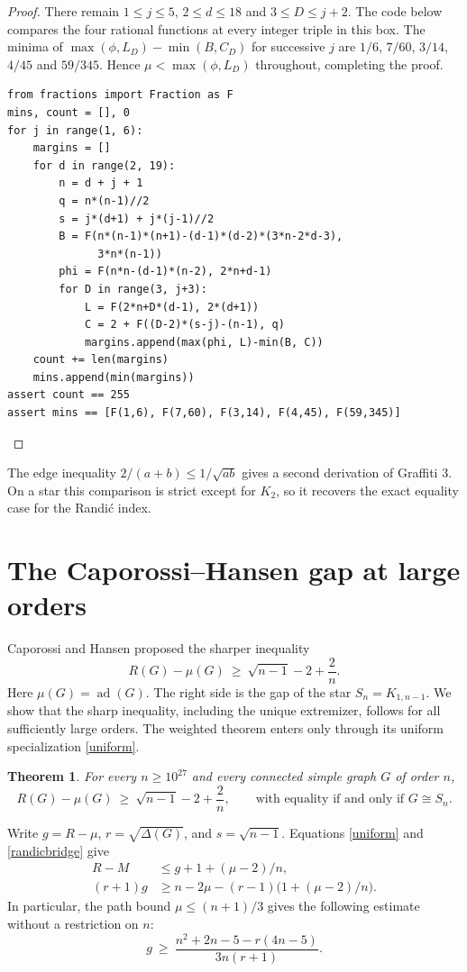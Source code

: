 \documentclass[11pt,a4paper]{article}
\newtheorem{theorem}{Theorem}[section]
\theoremstyle{remark}\newtheorem*{remark}{Remark}
\begin{document}
\begin{proof}
There remain $1\le j\le5$, $2\le d\le18$ and $3\le D\le j+2$. The code below compares the four rational functions at every integer triple in this box. The minima of $\max(\phi,L_D)-\min(B,C_D)$ for successive $j$ are $1/6$, $7/60$, $3/14$, $4/45$ and $59/345$. Hence $\mu<\max(\phi,L_D)$ throughout, completing the proof.
\begin{lstlisting}[basicstyle=\ttfamily\footnotesize,breaklines=true]
from fractions import Fraction as F
mins, count = [], 0
for j in range(1, 6):
    margins = []
    for d in range(2, 19):
        n = d + j + 1
        q = n*(n-1)//2
        s = j*(d+1) + j*(j-1)//2
        B = F(n*(n-1)*(n+1)-(d-1)*(d-2)*(3*n-2*d-3),
              3*n*(n-1))
        phi = F(n*n-(d-1)*(n-2), 2*n+d-1)
        for D in range(3, j+3):
            L = F(2*n+D*(d-1), 2*(d+1))
            C = 2 + F((D-2)*(s-j)-(n-1), q)
            margins.append(max(phi, L)-min(B, C))
    count += len(margins)
    mins.append(min(margins))
assert count == 255
assert mins == [F(1,6), F(7,60), F(3,14), F(4,45), F(59,345)]
\end{lstlisting}
\end{proof}

The edge inequality $2/(a+b)\le1/\sqrt{ab}$ gives a second derivation of Graffiti 3. On a star this comparison is strict except for $K_2$, so it recovers the exact equality case for the Randi\'c index.


\section{The Caporossi--Hansen gap at large orders}\label{sec:capgap}

Caporossi and Hansen \cite{cap} proposed the sharper inequality
\[
 R(G)-\mu(G)\ \ge\ \sqrt{n-1}-2+\frac2n .
\]
Here $\mu(G)=\operatorname{ad}(G)$.  The right side is the gap of the star
$S_n=K_{1,n-1}$.  We show that the sharp inequality, including the unique
extremizer, follows for all sufficiently large orders.  The weighted theorem
enters only through its uniform specialization \eqref{uniform}.

\begin{theorem}\label{thm:eventualCH}
For every $n\ge 10^{27}$ and every connected simple
graph $G$ of order $n$,
\[
 R(G)-\mu(G)\ \ge\ \sqrt{n-1}-2+\frac2n,
 \qquad\text{with equality if and only if }G\cong S_n .
\]
\end{theorem}

Write $g=R-\mu$, $r=\sqrt{\Delta(G)}$, and $s=\sqrt{n-1}$.
Equations \eqref{uniform} and \eqref{randicbridge} give
\begin{align}
 R-M &\le g+1+(\mu-2)/n, \label{gapdiff}\\
 (r+1)g &\ge n-2\mu-(r-1)\bigl(1+(\mu-2)/n\bigr).\label{gapineq}
\end{align}
In particular, the path bound $\mu\le(n+1)/3$ gives the following estimate
without a restriction on $n$:
\[
 g\ \ge\ \frac{n^2+2n-5-r(4n-5)}{3n(r+1)} .
\]
\end{document}
